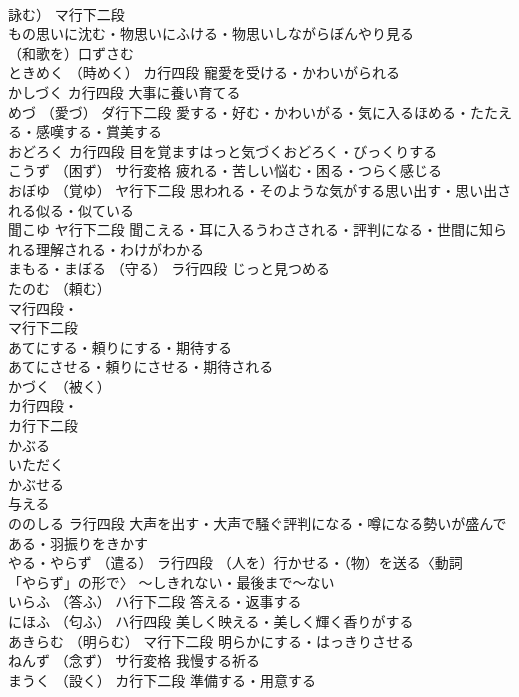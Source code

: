 \documentclass[8pt]{extreport}
\begin{document}
\begin{CJK}{UTF8}{min}
\\	詠む）	マ行下二段	
\\	もの思いに沈む・物思いにふける・物思いしながらぼんやり見る
\\	（和歌を）口ずさむ
\\	ときめく	（時めく）	カ行四段	寵愛を受ける・かわいがられる
\\	かしづく		カ行四段	大事に養い育てる
\\	めづ	（愛づ）	ダ行下二段	愛する・好む・かわいがる・気に入るほめる・たたえる・感嘆する・賞美する
\\	おどろく		カ行四段	目を覚ますはっと気づくおどろく・びっくりする
\\	こうず	（困ず）	サ行変格	疲れる・苦しい悩む・困る・つらく感じる
\\	おぼゆ	（覚ゆ）	ヤ行下二段	思われる・そのような気がする思い出す・思い出される似る・似ている
\\	聞こゆ		ヤ行下二段	聞こえる・耳に入るうわさされる・評判になる・世間に知られる理解される・わけがわかる
\\	まもる・まぼる	（守る）	ラ行四段	じっと見つめる
\\	たのむ	（頼む）	
\\	マ行四段・
\\	マ行下二段	
\\	あてにする・頼りにする・期待する
\\	あてにさせる・頼りにさせる・期待される
\\	かづく	（被く）	
\\	カ行四段・
\\	カ行下二段	
\\	かぶる 
\\	いただく
\\	かぶせる
\\	与える
\\	ののしる		ラ行四段	大声を出す・大声で騒ぐ評判になる・噂になる勢いが盛んである・羽振りをきかす
\\	やる・やらず	（遣る）	ラ行四段	（人を）行かせる・（物）を送る〈動詞
\\	「やらず」の形で〉 ～しきれない・最後まで～ない
\\	いらふ	（答ふ）	ハ行下二段	答える・返事する
\\	にほふ	（匂ふ）	ハ行四段	美しく映える・美しく輝く香りがする
\\	あきらむ	（明らむ）	マ行下二段	明らかにする・はっきりさせる
\\	ねんず	（念ず）	サ行変格	我慢する祈る
\\	まうく	（設く）	カ行下二段	準備する・用意する

\end{CJK}
\end{document}
